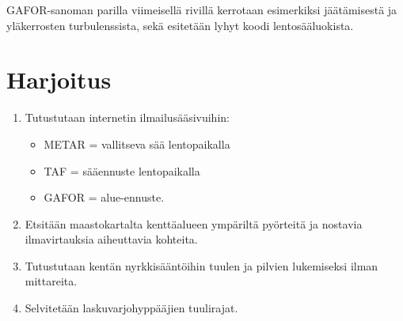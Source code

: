 GAFOR-sanoman parilla viimeisellä rivillä kerrotaan esimerkiksi jäätämisestä ja yläkerrosten turbulenssista, sekä esitetään lyhyt koodi lentosääluokista. 

\section{Harjoitus}
\label{saaoppi-harjoitus}

\begin{enumerate}[label=\bfseries \arabic*)]
\item  Tutustutaan internetin ilmailusääsivuihin: 
	\begin{itemize}
	\item  METAR = vallitseva sää lentopaikalla 
	\item  TAF = sääennuste lentopaikalla 
	\item  GAFOR = alue-ennuste. 
	\end{itemize}
\item  Etsitään maastokartalta kenttäalueen ympäriltä pyörteitä ja nostavia ilmavirtauksia aiheuttavia kohteita. 
\item  Tutustutaan kentän nyrkkisääntöihin tuulen ja pilvien lukemiseksi ilman mittareita.  
\item  Selvitetään laskuvarjohyppääjien tuulirajat. 
\end{enumerate}
